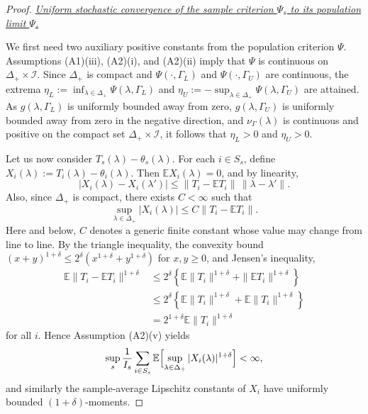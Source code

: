 \documentclass[12pt,leqno,titlepage]{amsart}
\newcommand{\1}{\mathbbm{1}}
\begin{document}
\begin{bibunit}
{\begin{proof}
\medskip

\noindent\textit{\underline{Uniform stochastic convergence of the sample criterion $\Psi_s$ to its population limit $\Psi$.}}%

We first need two auxiliary positive constants from the population criterion $\Psi$. Assumptions \textup{(A1)(iii)}, \textup{(A2)(i)}, and \textup{(A2)(ii)} imply that \(\Psi\) is continuous on \(\Delta_+\times\mathcal I\). Since \(\Delta_+\) is compact and \(\Psi(\cdot,\Gamma_L)\) and \(\Psi(\cdot,\Gamma_U)\) are continuous, the extrema
$
\eta_L:=\inf_{\lambda\in\Delta_+}\Psi(\lambda,\Gamma_L)$ and $
\eta_U:=-\sup_{\lambda\in\Delta_+}\Psi(\lambda,\Gamma_U)
$
are attained. As \(g(\lambda,\Gamma_L)\) is uniformly bounded away from zero, \(g(\lambda,\Gamma_U)\) is uniformly bounded away from zero in the negative direction, and \(\nu_\Gamma(\lambda)\) is continuous and positive on the compact set \(\Delta_+\times\mathcal I\), it follows that
$
\eta_L>0$ and $
\eta_U>0.
$

Let us now consider \(T_s(\lambda)-\theta_s(\lambda)\). For each \(i\in S_s\), define
$
X_i(\lambda):=T_i(\lambda)-\theta_i(\lambda).
$
Then \(\mathbb EX_i(\lambda)=0\), and by linearity,
\[
|X_i(\lambda)-X_i(\lambda')|
\le
\|T_i-\mathbb ET_i\|\,\|\lambda-\lambda'\|.
\]
Also, since \(\Delta_+\) is compact, there exists \(C<\infty\) such that
\[
\sup_{\lambda\in\Delta_+}|X_i(\lambda)|
\le C \|T_i-\mathbb ET_i\|.
\]
Here and below, $C$ denotes a generic finite constant whose value may change from line to line. By the triangle inequality, the convexity bound
$(x+y)^{1+\delta}\le 2^\delta(x^{1+\delta}+y^{1+\delta})$ for
$x,y\ge 0$, and Jensen's inequality,
\[
\begin{aligned}
\mathbb E\|T_i-\mathbb ET_i\|^{1+\delta}
&\le
2^\delta\left\{
\mathbb E\|T_i\|^{1+\delta}
+
\|\mathbb ET_i\|^{1+\delta}
\right\}  \\
&\le
2^\delta\left\{
\mathbb E\|T_i\|^{1+\delta}
+
\mathbb E\|T_i\|^{1+\delta}
\right\}  \\
&=
2^{1+\delta}\mathbb E\|T_i\|^{1+\delta}
\end{aligned}
\]
for all \(i\). Hence Assumption \textup{(A2)(v)} yields
\[
\sup_s \frac1{I_s}\sum_{i\in S_s}\mathbb E\Bigl[\sup_{\lambda\in\Delta_+}|X_i(\lambda)|^{1+\delta}\Bigr]<\infty,
\]
and similarly the sample-average Lipschitz constants of \(X_i\) have uniformly bounded \((1+\delta)\)-moments.


\end{proof}}
\end{bibunit}
\end{document}
